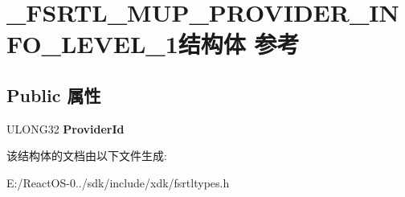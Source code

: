 \hypertarget{struct___f_s_r_t_l___m_u_p___p_r_o_v_i_d_e_r___i_n_f_o___l_e_v_e_l__1}{}\section{\+\_\+\+F\+S\+R\+T\+L\+\_\+\+M\+U\+P\+\_\+\+P\+R\+O\+V\+I\+D\+E\+R\+\_\+\+I\+N\+F\+O\+\_\+\+L\+E\+V\+E\+L\+\_\+1结构体 参考}
\label{struct___f_s_r_t_l___m_u_p___p_r_o_v_i_d_e_r___i_n_f_o___l_e_v_e_l__1}
\subsection*{Public 属性}
\begin{DoxyCompactItemize}
\item 
\mbox{\label{struct___f_s_r_t_l___m_u_p___p_r_o_v_i_d_e_r___i_n_f_o___l_e_v_e_l__1_a3378362fb2b6e1ff6beb0119414deb61}} 
U\+L\+O\+N\+G32 {\bfseries Provider\+Id}
\end{DoxyCompactItemize}


该结构体的文档由以下文件生成\+:\begin{DoxyCompactItemize}
\item 
E\+:/\+React\+O\+S-\/0../sdk/include/xdk/fsrtltypes.\+h\end{DoxyCompactItemize}
